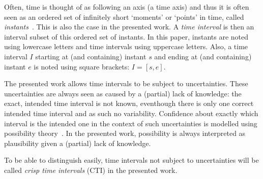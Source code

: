 Often, time is thought of as following an axis (a time axis) and thus it is often seen as an ordered set of infinitely short `moments' or `points' in time, called \emph{instants}~\cite{Jensen1998}. This is also the case in the presented work. A \emph{time interval} is then an interval subset of this ordered set of instants. In this paper, instants are noted using lowercase letters and time intervals using uppercase letters. Also, a time interval $I$ starting at (and containing) instant $s$ and ending at (and containing) instant $e$ is noted using square brackets: $I = \left[s, e\right]$.

The presented work allows time intervals to be subject to uncertainties. These uncertainties are always seen as caused by a (partial) lack of knowledge: the exact, intended time interval is not known, eventhough there is only one correct intended time interval and as such no variability. Confidence about exactly which interval is the intended one in the context of such uncertainties is modelled using possibility theory~\cite{Dubois1983}. In the presented work, possibility is always interpreted as plausibility given a (partial) lack of knowledge.

To be able to distinguish easily, time intervals not subject to uncertainties will be called \emph{crisp time intervals} (CTI) in the presented work.